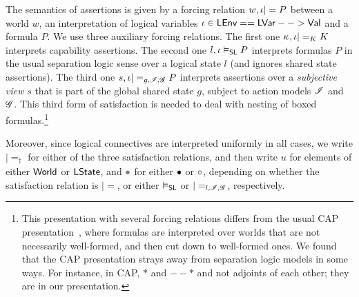 
The semantics of \colosl assertions is given by a forcing relation
$w,\iota|= P$ between a world $w$, an interpretation of logical
variables $\iota\in\textsf{LEnv} == \mathsf{LVar} --> \mathsf{Val}$ and a formula
$P$. We use three auxiliary forcing relations. The first one
$\kappa_{},\iota|=_K K$ interprets capability assertions. The second one
$l,\iota\mathrel{\vDash_{\mathsf{SL}}} P$ interprets formulas $P$ in the usual separation
logic sense over a logical state $l$ (and ignores shared state
assertions). The third one $s,\iota|=_{g,\mathscr{I},\mathscr{G}} P$ interprets
assertions over a \emph{subjective view} $s$ that is part of the
global shared state $g$, subject to action models $\mathscr{I}$ and
$\mathscr{G}$. This third form of satisfaction is needed to deal with
nesting of boxed formulas.\footnote{This presentation with several
  forcing relations differs from the usual CAP
  presentation~\cite{cap-ecoop10}, where formulas are interpreted over
  worlds that are not necessarily well-formed, and then cut down to
  well-formed ones. We found that the CAP presentation strays away
  from separation logic models in some ways. For instance, in CAP, $*$
  and $--*$ and not adjoints of each other; they are in our
  presentation.}

Moreover, since logical connectives are interpreted uniformly in all
cases, we write $|=_\dagger$ for either of the three satisfaction
relations, and then write $u$ for elements of either $\textsf{World}$ or
$\textsf{LState}$, and $\gray$ for either $\bullet$ or $\circ$,
depending on whether the satisfaction relation is
$|=$, or either $\mathrel{\vDash_{\mathsf{SL}}}$ or $|=_{l,\mathscr{I},\mathscr{G}}$,
respectively.

